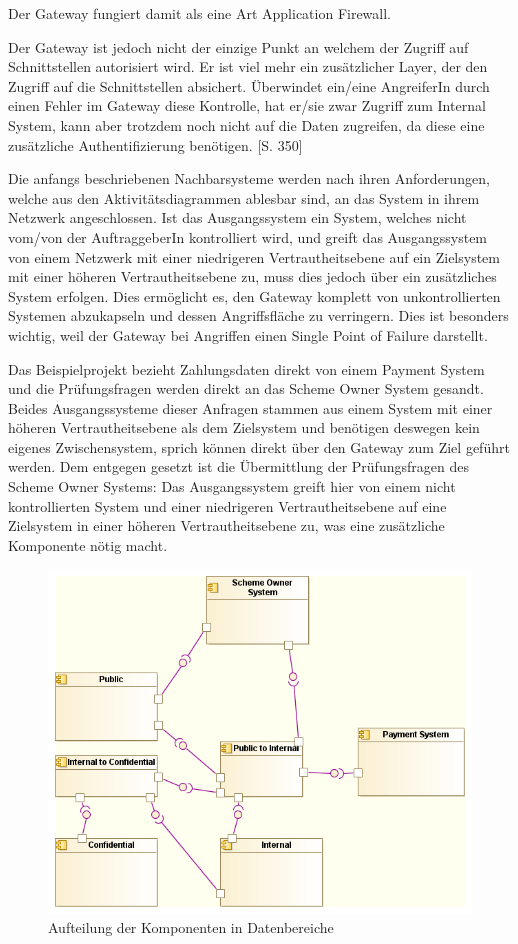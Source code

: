 Der Gateway fungiert damit als eine Art Application Firewall.

Der Gateway ist jedoch nicht der einzige Punkt an welchem der Zugriff auf Schnittstellen autorisiert wird. Er ist viel mehr ein zusätzlicher Layer, der den Zugriff auf die Schnittstellen absichert. Überwindet ein/eine AngreiferIn durch einen Fehler im Gateway diese Kontrolle, hat er/sie zwar Zugriff zum Internal System, kann aber trotzdem noch nicht auf die Daten zugreifen, da diese eine zusätzliche Authentifizierung benötigen. \cite{sec}[S. 350]

Die anfangs beschriebenen Nachbarsysteme werden nach ihren Anforderungen, welche aus den Aktivitätsdiagrammen ablesbar sind, an das System in ihrem Netzwerk angeschlossen. Ist das Ausgangssystem ein System, welches nicht vom/von der AuftraggeberIn kontrolliert wird, und greift das Ausgangssystem von einem Netzwerk mit einer niedrigeren Vertrautheitsebene auf ein Zielsystem mit einer höheren Vertrautheitsebene zu, muss dies jedoch über ein zusätzliches System erfolgen. Dies ermöglicht es, den Gateway komplett von unkontrollierten Systemen abzukapseln und dessen Angriffsfläche zu verringern. Dies ist besonders wichtig, weil der Gateway bei Angriffen einen Single Point of Failure darstellt.

Das Beispielprojekt bezieht Zahlungsdaten direkt von einem Payment System und die Prüfungsfragen werden direkt an das Scheme Owner System gesandt. Beides Ausgangssysteme dieser Anfragen stammen aus einem System mit einer höheren Vertrautheitsebene als dem Zielsystem und benötigen deswegen kein eigenes Zwischensystem, sprich können direkt über den Gateway zum Ziel geführt werden. Dem entgegen gesetzt ist die Übermittlung der Prüfungsfragen des Scheme Owner Systems: Das Ausgangssystem greift hier von einem nicht kontrollierten System und einer niedrigeren Vertrautheitsebene auf eine Zielsystem in einer höheren Vertrautheitsebene zu, was eine zusätzliche Komponente nötig macht.

\begin{figure}[H]
    \centering
    \includegraphics[scale=0.7]{uml/dataarch.png}
    \caption{Aufteilung der Komponenten in Datenbereiche}
\end{figure}

